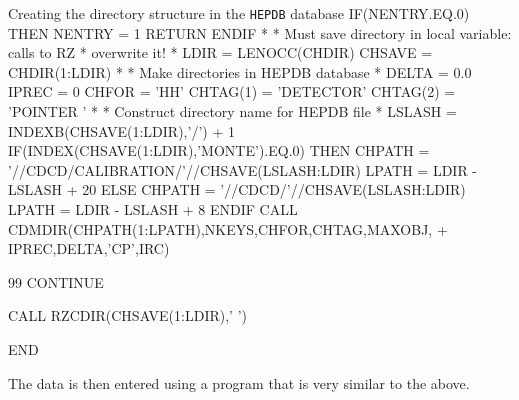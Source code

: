 \begin{XMPt}{Creating the directory structure in the {\tt HEPDB} database}
      IF(NENTRY.EQ.0) THEN
         NENTRY = 1
         RETURN
      ENDIF
*
*     Must save directory in local variable: calls to RZ
*     overwrite it!
*
      LDIR   = LENOCC(CHDIR)
      CHSAVE = CHDIR(1:LDIR)
*
*     Make directories in HEPDB database
*
      DELTA = 0.0
      IPREC = 0
      CHFOR = 'HH'
      CHTAG(1) = 'DETECTOR'
      CHTAG(2) = 'POINTER '
*
*     Construct directory name for HEPDB file
*
      LSLASH   = INDEXB(CHSAVE(1:LDIR),'/') + 1
      IF(INDEX(CHSAVE(1:LDIR),'MONTE').EQ.0) THEN
         CHPATH   = '//CDCD/CALIBRATION/'//CHSAVE(LSLASH:LDIR)
         LPATH    = LDIR - LSLASH + 20
      ELSE
         CHPATH   = '//CDCD/'//CHSAVE(LSLASH:LDIR)
         LPATH    = LDIR - LSLASH + 8
      ENDIF
      CALL CDMDIR(CHPATH(1:LPATH),NKEYS,CHFOR,CHTAG,MAXOBJ,
     +            IPREC,DELTA,'CP',IRC)

   99 CONTINUE

      CALL RZCDIR(CHSAVE(1:LDIR),' ')

      END
\end{XMPt}

The data is then entered using a program that is very similar to the above.

